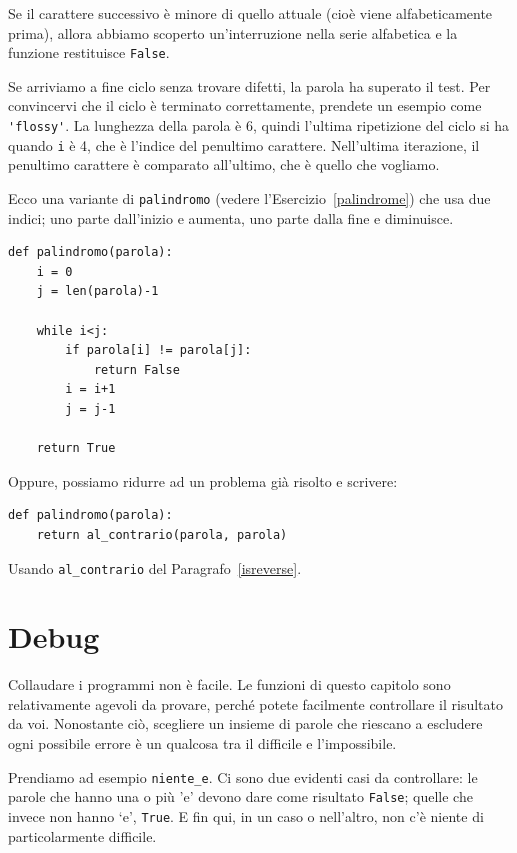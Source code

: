 \documentclass[10pt]{book}
\begin{document}
Se il carattere successivo è minore di quello attuale (cioè viene alfabeticamente prima), allora abbiamo scoperto un'interruzione nella serie alfabetica e la funzione restituisce {\tt False}.

Se arriviamo a fine ciclo senza trovare difetti, la parola ha superato il test. Per convincervi che il ciclo è terminato correttamente, prendete un esempio come \verb"'flossy'".  La lunghezza della parola è 6, quindi l'ultima ripetizione del ciclo si ha quando {\tt i} è 4, che è l'indice del penultimo carattere. Nell'ultima iterazione, il penultimo carattere è comparato all'ultimo, che è quello che vogliamo.

Ecco una variante di \verb"palindromo" (vedere l'Esercizio~\ref{palindrome}) che usa due indici; uno parte dall'inizio e aumenta, uno parte dalla fine e diminuisce.

\begin{verbatim}
def palindromo(parola):
    i = 0
    j = len(parola)-1

    while i<j:
        if parola[i] != parola[j]:
            return False
        i = i+1
        j = j-1

    return True
\end{verbatim}

Oppure, possiamo ridurre ad un problema già risolto e scrivere:

\begin{verbatim}
def palindromo(parola):
    return al_contrario(parola, parola)
\end{verbatim}

Usando \verb"al_contrario" del Paragrafo~\ref{isreverse}.


\section{Debug}

Collaudare i programmi non è facile. Le funzioni di questo capitolo sono relativamente agevoli da provare, perché potete facilmente controllare il risultato da voi. Nonostante ciò, scegliere un insieme di parole che riescano a escludere ogni possibile errore è un qualcosa tra il difficile e l'impossibile.

Prendiamo ad esempio \verb"niente_e". Ci sono due evidenti casi da controllare: le parole che hanno una o più 'e' devono dare come risultato {\tt False};
quelle che invece non hanno `e', {\tt True}. E fin qui, in un caso o nell'altro, non c'è niente di particolarmente difficile.
\end{document}
